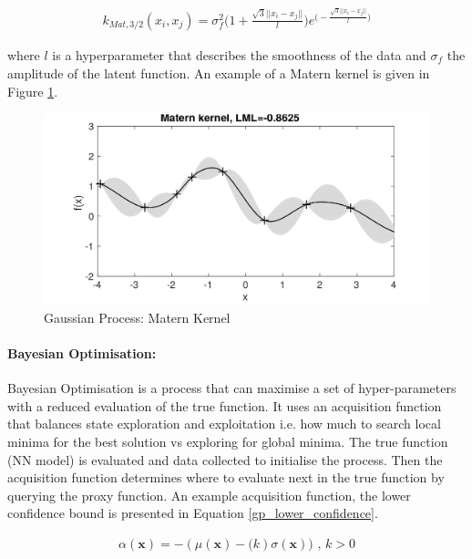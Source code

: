 \documentclass[11pt,twoside]{report}
\begin{document}
\begin{equation}
\begin{aligned}
k_{Mat,3/2}(x_{i},x_{j}) = 
\sigma_{f}^{2} \bigg ( 1 + 
\frac{\sqrt{3}||x_{i}-x_{j}||}{\mathit{l}} \bigg )e^{ \big (-\frac{\sqrt{3}||x_{i}-x_{j}||}{\mathit{l}} \big )}
\end{aligned}
\label{matern}
\end{equation}

where $\mathit{l}$ is a hyperparameter that describes the smoothness of the data and $\mathit{\sigma_{f}}$ the amplitude of the latent function. An example of a Matern kernel is given in Figure \ref{matern_kernel_fig}.


\noindent \begin{figure}[h!]
	\includegraphics[width = 1.0\hsize]{./figures/Matern_Kernel.png}
	\caption{Gaussian Process: Matern Kernel \cite{Marc_Deisenroth_Notes}}
	\label{matern_kernel_fig}
\end{figure}

\paragraph{Bayesian Optimisation:}
Bayesian Optimisation is a process that can maximise a set of hyper-parameters with a reduced evaluation of the true function. It uses an acquisition function that balances state exploration and exploitation i.e. how much to search local minima for the best solution vs exploring for global minima. The true function (NN model) is evaluated and data collected to initialise the process. Then the acquisition function determines where to evaluate next in the true function by querying the proxy function. An example acquisition function, the lower confidence bound \cite{SrinivasNiranjan2010GPOi} is presented in Equation \ref{gp_lower_confidence}.

\begin{equation}
\begin{aligned}
\alpha(\mathbf{x}) = -(\mu(\mathbf{x}) - \mathit(k) \sigma (\mathbf{x})) \text{ , } k>0
\end{aligned}
\label{gp_lower_confidence}
\end{equation}
\end{document}
